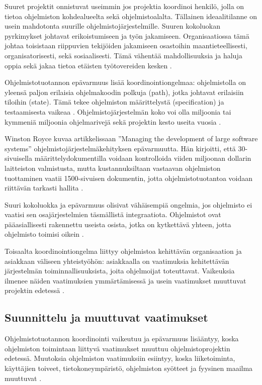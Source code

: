 \documentclass[finnish]{tktltiki2}
\theoremstyle{definition}
\theoremstyle{remark}
\begin{document}
Suuret projektit onnistuvat useimmin jos projektia koordinoi henkilö, jolla on tietoa ohjelmiston kohdealueelta sekä ohjelmistoalalta. Tällainen ideaalitilanne on usein mahdotonta suurille ohjelmistojärjestelmille. Suuren kokoluokan pyrkimykset johtavat erikoistumiseen ja työn jakamiseen. Organisaatiossa tämä johtaa toisistaan riippuvien tekijöiden jakamiseen osastoihin maantieteellisesti, organisatorisesti, sekä sosiaalisesti. Tämä vähentää mahdollisuuksia ja haluja oppia sekä jakaa tietoa etäisten työtovereiden kesken \cite{KES95}.

Ohjelmistotuotannon epävarmuus lisää koordinointiongelmaa: ohjelmistolla on yleensä paljon erilaisia ohjelmakoodin polkuja (path), jotka johtavat erilaisiin tiloihin (state). Tämä tekee ohjelmiston määrittelystä (specification) ja testaamisesta vaikeaa \cite{BOE06}. Ohjelmistojärjestelmän koko voi olla miljoonia tai kymmeniä miljoonia ohjelmarivejä sekä projektin kesto useita vuosia \cite{KES95}. 

Winston Royce kuvaa artikkelissaan ''Managing the development of large software systems'' ohjelmistojärjestelmäkehityksen epävarmuutta. Hän kirjoitti, että 30-sivuisella määrittelydokumentilla voidaan kontrolloida viiden miljoonan dollarin laitteiston valmistusta, mutta kustannuksiltaan vastaavan ohjelmiston tuottaminen vaatii 1500-sivuisen dokumentin, jotta ohjelmistotuotantoa voidaan riittävän tarkasti hallita \cite{ROY70}.

Suuri kokoluokka ja epävarmuus olisivat vähäisempiä ongelmia, jos ohjelmisto ei vaatisi sen osajärjestelmien täsmällistä integraatiota. Ohjelmistot ovat pääasiallisesti rakennettu useista osista, jotka on kytkettävä yhteen, jotta ohjelmisto toimisi oikein \cite{KES95}.

Toisaalta koordinointiongelma liittyy ohjelmistoa kehittävän organisaation ja asiakkaan väliseen yhteistyöhön: asiakkaalla on vaatimuksia kehitettävän järjestelmän toiminnallisuuksista, joita ohjelmoijat toteuttavat. Vaikeuksia ilmenee näiden vaatimuksien ymmärtämisessä ja usein vaatimukset muuttuvat projektin edetessä \cite{FOW01a}. 

\subsection{Suunnittelu ja muuttuvat vaatimukset}

Ohjelmistotuotannon koordinointi vaikeutuu ja epävarmuus lisääntyy, koska ohjelmiston toimintaan liittyvä vaatimukset muuttuu ohjelmistoprojektin edetessä. Muutoksia ohjelmiston vaatimuksiin esiintyy, koska liiketoiminta, käyttäjien toiveet, tietokoneympäristö, ohjelmiston syötteet ja fyysinen maailma muuttuvat \cite{KES95}.
\end{document}
